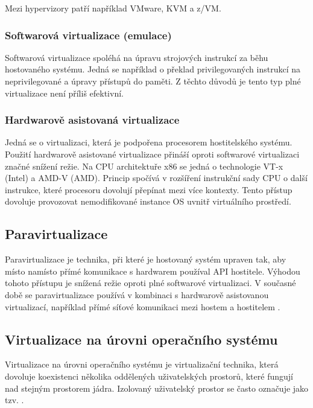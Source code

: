 Mezi hypervizory patří například VMware, KVM a z/VM.

\subsubsection{Softwarová virtualizace (emulace)}

Softwarová virtualizace spoléhá na úpravu strojových instrukcí za běhu hostovaného systému.
Jedná se například o překlad privilegovaných instrukcí na neprivilegované a úpravy přístupů do paměti.
Z těchto důvodů je tento typ plné virtualizace není příliš efektivní.

\subsubsection{Hardwarově asistovaná virtualizace}

Jedná se o virtualizaci, která je podpořena procesorem hostitelského systému.
Použití hardwarově asistované virtualizace přináší oproti softwarové virtualizaci značné snížení režie.
Na CPU architektuře x86 se jedná o technologie VT-x (Intel) a AMD-V (AMD).
Princip spočívá v rozšíření instrukční sady CPU o další instrukce, které procesoru dovolují přepínat mezi více kontexty.
Tento přístup dovoluje provozovat nemodifikované instance OS uvnitř virtuálního prostředí.

\subsection{Paravirtualizace}

Paravirtualizace je technika, při které je hostovaný systém upraven tak, aby místo namísto přímé komunikace s hardwarem používal API hostitele.
Výhodou tohoto přístupu je snížená režie oproti plné softwarové virtualizaci.
V současné době se paravirtualizace používá v kombinaci s hardwarově asistovanou virtualizací, například přímé síťové komunikaci mezi hostem a hostitelem \cite{virtio}.


\subsection{Virtualizace na úrovni operačního systému}

Virtualizace na úrovni operačního systému je virtualizační technika, která dovoluje koexistenci několika oddělených uživatelských prostorů, které fungují nad stejným prostorem jádra.
Izolovaný uživatelský prostor se často označuje jako tzv. .

